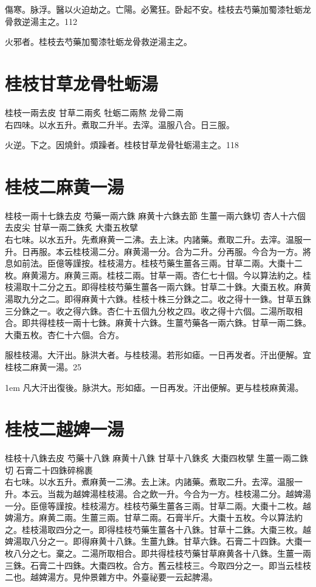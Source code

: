 傷寒。脉浮。醫以火迫劫之。亡陽。{\khaaitp 必}驚狂。卧起不安。桂枝去芍藥加蜀漆牡蛎龙骨救逆湯主之。112

火邪者。桂枝去芍藥加蜀漆牡蛎龙骨救逆湯主之。

\section{桂枝甘草龙骨牡蛎湯}

桂枝{\scriptsize 一兩去皮} 甘草{\scriptsize 二兩炙} 牡蛎{\scriptsize 二兩熬} 龙骨{\scriptsize 二兩}\\
右四味。以水五升。煮取二升半。去滓。温服八合。日三服。

火逆。下之。因燒針。煩躁者。桂枝甘草龙骨牡蛎湯主之。118

\section{桂枝二麻黄一湯}

桂枝{\scriptsize 一兩十七銖去皮} 芍藥{\scriptsize 一兩六銖} 麻黄{\scriptsize 十六銖去節} 生薑{\scriptsize 一兩六銖切} 杏人{\scriptsize 十六個去皮尖} 甘草{\scriptsize 一兩二銖炙} 大棗{\scriptsize 五枚擘}\\
右七味。以水五升。先煮麻黄一二沸。去上沫。内諸藥。煮取二升。去滓。温服一升。日再服。本云桂枝湯二分。麻黄湯一分。合为二升。分再服。今合为一方。將息如前法。{\scriptsize 臣億等謹按。桂枝湯方。桂枝芍藥生薑各三兩。甘草二兩。大棗十二枚。麻黄湯方。麻黄三兩。桂枝二兩。甘草一兩。杏仁七十個。今以算法約之。桂枝湯取十二分之五。即得桂枝芍藥生薑各一兩六銖。甘草二十銖。大棗五枚。麻黄湯取九分之二。即得麻黄十六銖。桂枝十株三分銖之二。收之得十一銖。甘草五銖三分銖之一。收之得六銖。杏仁十五個九分枚之四。收之得十六個。二湯所取相合。即共得桂枝一兩十七銖。麻黄十六銖。生薑芍藥各一兩六銖。甘草一兩二銖。大棗五枚。杏仁十六個。合方。}{\zhaoben}

服桂枝湯。大汗出。脉洪大者。与桂枝湯。若形如瘧。一日再发者。汗出便解。宜桂枝二麻黄一湯。25

\hangindent 1em
凡大汗出復後。脉洪大。形如瘧。一日再发。汗出便解。更与桂枝麻黄湯。{\yixin}

\section{桂枝二越婢一湯}

桂枝{\scriptsize 十八銖去皮} 芍藥{\scriptsize 十八銖} 麻黄{\scriptsize 十八銖} 甘草{\scriptsize 十八銖炙} 大棗{\scriptsize 四枚擘} 生薑{\scriptsize 一兩二銖切} 石膏{\scriptsize 二十四銖碎棉裹}\\
右七味。以水五升。煮麻黄一二沸。去上沫。内諸藥。煮取二升。去滓。温服一升。本云。当裁为越婢湯桂枝湯。合{\khaaitp 之}飲一升。今合为一方。桂枝湯二分。越婢湯一分。{\scriptsize 臣億等謹按。桂枝湯方。桂枝芍藥生薑各三兩。甘草二兩。大棗十二枚。越婢湯方。麻黄二兩。生薑三兩。甘草二兩。石膏半斤。大棗十五枚。今以算法約之。桂枝湯取四分之一。即得桂枝芍藥生薑各十八銖。甘草十二銖。大棗三枚。越婢湯取八分之一。即得麻黄十八銖。生薑九銖。甘草六銖。石膏二十四銖。大棗一枚八分之七。棄之。二湯所取相合。即共得桂枝芍藥甘草麻黄各十八銖。生薑一兩三銖。石膏二十四銖。大棗四枚。合方。舊云桂枝三。今取四分之一。即当云桂枝二也。越婢湯方。見仲景雜方中。外臺祕要一云起脾湯。}

